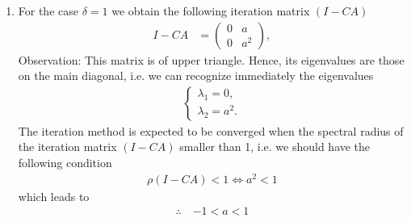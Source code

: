 \documentclass[12pt]{article}
\begin{document}
\begin{enumerate}
	\item For the case $\delta=1$ we obtain the following iteration matrix $(I-CA)$
	      \begin{align}
		      I-CA & =
		      \begin{pmatrix}
			      0 & a   \\
			      0 & a^2
		      \end{pmatrix},
	      \end{align}
	      Observation: This matrix is of upper triangle. 
	      Hence, its eigenvalues are those on the main diagonal, 
	      i.e. we can recognize immediately the eigenvalues 
	      \begin{align}
		      \begin{cases}
			      \lambda_{1} = 0, \\
			      \lambda_{2} = a^2.
		      \end{cases}
	      \end{align}
	      The iteration method is expected to be converged when
	      the spectral radius of the iteration matrix $(I-CA)$ smaller than 1,
	      i.e. we should have the following condition
	      \begin{align*}
		      \rho(I-CA) < 1 
		      \Leftrightarrow a^2 <1 
	      \end{align*}
	      which leads to
	      \begin{align}
		      \therefore\quad
		      \boxed{
			      -1 < a < 1
		      }
	      \end{align}
\end{enumerate}

\newpage
\end{document}
